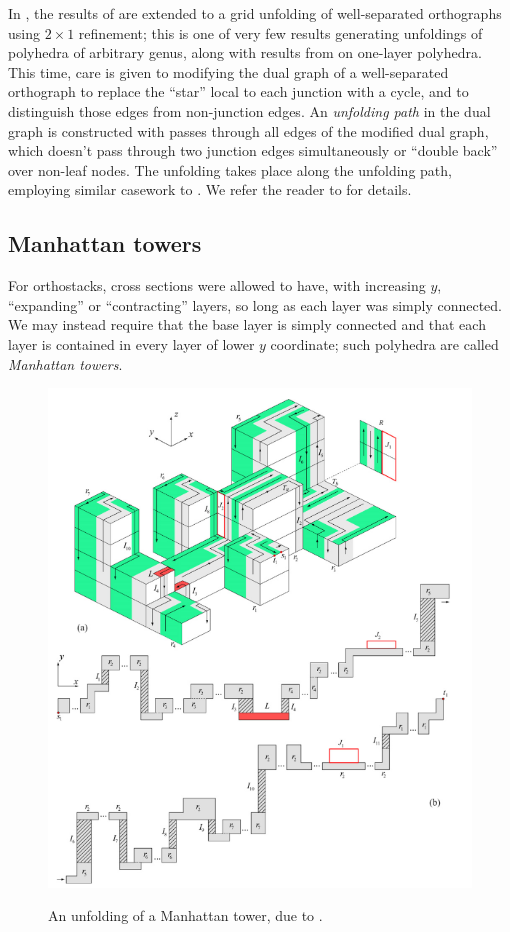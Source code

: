 \documentclass{article}
\begin{document}
In \cite{Ho_Chang_Yen}, the results of \cite{Damian_Flatland_Well_Separated} are extended to a grid unfolding of well-separated orthographs using $2 \times 1$ refinement;
this is one of very few results generating unfoldings of polyhedra of arbitrary genus, along with results from \cite{Chang_Yen} on one-layer polyhedra.
This time, care is given to modifying the dual graph of a well-separated orthograph to replace the ``star'' local to each junction with a cycle, and to distinguish those edges from non-junction edges.
An \emph{unfolding path} in the dual graph is constructed with passes through all edges of the modified dual graph, which doesn't pass through two junction edges simultaneously or ``double back'' over non-leaf nodes.
The unfolding takes place along the unfolding path, employing similar casework to \cite{Damian_Flatland_Well_Separated}.
We refer the reader to \cite{Ho_Chang_Yen} for details.



\subsection{Manhattan towers}\label{Constant manhattan subsection}
For orthostacks, cross sections were allowed to have, with increasing $y$, ``expanding'' or ``contracting'' layers, so long as each layer was simply connected.
We may instead require that the base layer is simply connected and that each layer is contained in every layer of lower $y$ coordinate;
such polyhedra are called \emph{Manhattan towers}.

\begin{figure}
  \begin{center}
    \includegraphics[width=.8\textwidth]{./figs/Manhattan_tower_unfolding.png}\\
  \end{center}
  \caption{
    An unfolding of a Manhattan tower, due to \cite[Fig. 12]{Damian_Flatland_Orourke_Manhattan}.
  }\label{Manhattan tower unfolding figure}
\end{figure}
\end{document}
